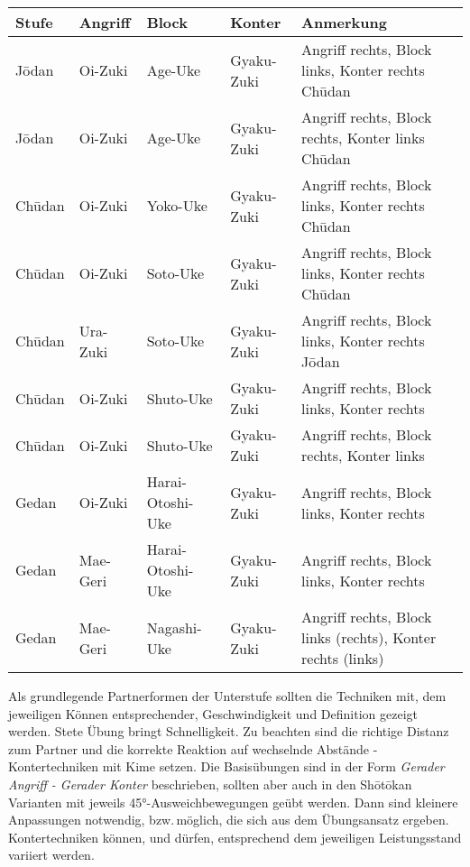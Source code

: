 \setcounter{num}{0}
\setcounter{numz}{0}
\begin{tcolorbox}[colframe=GKD,colback=white,coltitle=white,title=Kihon Ippon Kumite\indent {\scriptsize mit Anregungen von Alfred Heubeck - Sh\={o}t\={o}kan Karate-D\={o} Hausheim - Kihon-Ippon-Kumite 1-3}]
	\null\vfill\null
	{\small 	\begin{tabularx}{\textwidth}{llllX}
			\textbf{Stufe} 	& \textbf{Angriff} 	& \textbf{Block}&\textbf{Konter}&Anmerkung\\
			\midrule
			J\={o}dan 	& Oi-Zuki 	& Age-Uke			&Gyaku-Zuki	& Angriff rechts, Block links, Konter rechts Ch\={u}dan \\
			J\={o}dan 	& Oi-Zuki 	& Age-Uke			&Gyaku-Zuki	& Angriff rechts, Block rechts, Konter links Ch\={u}dan \\	
			Ch\={u}dan	& Oi-Zuki	& Yoko-Uke			&Gyaku-Zuki	& Angriff rechts, Block links, Konter rechts Ch\={u}dan \\
			Ch\={u}dan	& Oi-Zuki	& Soto-Uke			&Gyaku-Zuki	& Angriff rechts, Block links, Konter rechts Ch\={u}dan \\
			Ch\={u}dan	& Ura-Zuki	& Soto-Uke			&Gyaku-Zuki	& Angriff rechts, Block links, Konter rechts J\={o}dan \\
			Ch\={u}dan	& Oi-Zuki	& Shuto-Uke			&Gyaku-Zuki	& Angriff rechts, Block links, Konter rechts \\
			Ch\={u}dan	& Oi-Zuki	& Shuto-Uke			&Gyaku-Zuki	& Angriff rechts, Block rechts, Konter links \\
			Gedan		& Oi-Zuki	& Harai-Otoshi-Uke	&Gyaku-Zuki	& Angriff rechts, Block links, Konter rechts  \\
			Gedan		& Mae-Geri	& Harai-Otoshi-Uke	&Gyaku-Zuki	& Angriff rechts, Block links, Konter rechts \\
			Gedan		& Mae-Geri	& Nagashi-Uke		&Gyaku-Zuki	& Angriff rechts, Block links (rechts), Konter rechts (links)\\
			\midrule
	\end{tabularx}}\null\vfill\null
		\begin{center}
			\begin{minipage}[t]{\textwidth-2\tabcolsep}
			{\footnotesize Als grundlegende Partnerformen der Unterstufe sollten die Techniken mit, dem jeweiligen Können entsprechender, Geschwindigkeit und Definition gezeigt werden. Stete Übung bringt Schnelligkeit. Zu beachten sind die richtige Distanz zum Partner und die korrekte Reaktion auf wechselnde Abstände - Kontertechniken mit Kime setzen. Die Basisübungen sind in der Form \textit{Gerader Angriff - Gerader Konter} beschrieben, sollten aber auch in den Sh\={o}t\={o}kan Varianten mit jeweils 45°-Ausweichbewegungen geübt werden. Dann sind kleinere Anpassungen notwendig, bzw.\,möglich, die sich aus dem Übungsansatz ergeben. Kontertechniken können, und dürfen, entsprechend dem jeweiligen Leistungsstand variiert werden.}\onehalfspacing\singlespacing

\end{minipage}
\end{center}
\end{tcolorbox}
